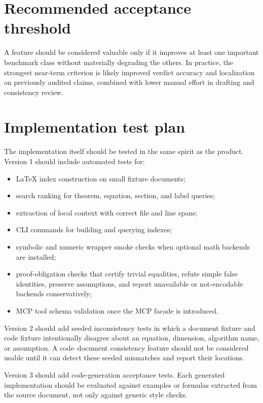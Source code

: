 \section{Recommended acceptance threshold}

A feature should be considered valuable only if it improves at least one important benchmark class without materially degrading the others. In practice, the strongest near-term criterion is likely improved verdict accuracy and localization on previously audited claims, combined with lower manual effort in drafting and consistency review.

\section{Implementation test plan}

The implementation itself should be tested in the same spirit as the product. Version 1 should include automated tests for:
\begin{itemize}
  \item LaTeX index construction on small fixture documents;
  \item search ranking for theorem, equation, section, and label queries;
  \item extraction of local context with correct file and line spans;
  \item CLI commands for building and querying indexes;
  \item symbolic and numeric wrapper smoke checks when optional math backends are installed;
  \item proof-obligation checks that certify trivial equalities, refute simple false identities, preserve assumptions, and report unavailable or not-encodable backends conservatively;
  \item MCP tool schema validation once the MCP facade is introduced.
\end{itemize}

Version 2 should add seeded inconsistency tests in which a document fixture and code fixture intentionally disagree about an equation, dimension, algorithm name, or assumption. A code--document consistency feature should not be considered usable until it can detect these seeded mismatches and report their locations.

Version 3 should add code-generation acceptance tests. Each generated implementation should be evaluated against examples or formulas extracted from the source document, not only against generic style checks.
